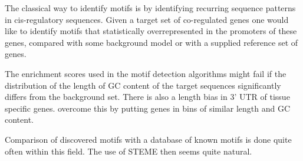\documentclass[12pt, onecolumn, oneside]{gsajnl}
\begin{document}
The classical way to identify motifs is by identifying recurring sequence patterns in cis-regulatory sequences. Given a target set of co-regulated genes
one would like to identify motifs that statistically overrepresented in the promoters of these genes, compared with some background model or with a 
supplied reference set of genes.   

The enrichment scores used in the motif detection algorithms might fail if the distribution of the length of GC content of the target sequences significantly
differs from the background set. There is also a length bias in 3' UTR of tissue specific genes. \citet{linhart2008transcription} overcome this by putting genes
in bins of similar length and GC content. 

Comparison of discovered motifs with a database of known motifs is done quite often within this field. The use of STEME then seems quite natural. 

\clearpage


\end{document}
